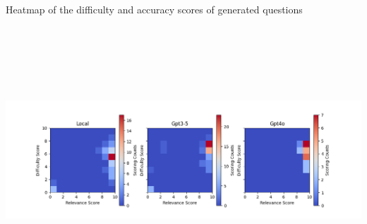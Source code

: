{
	Heatmap of the difficulty and accuracy scores of generated questions
    \begin{tikzfigure}
        \vspace*{-1.5cm}
        \hspace*{-1cm}
        \includegraphics[height=10cm]{figures/eval_plot.png}
    \end{tikzfigure}
    \vspace*{-2.5cm}
}


